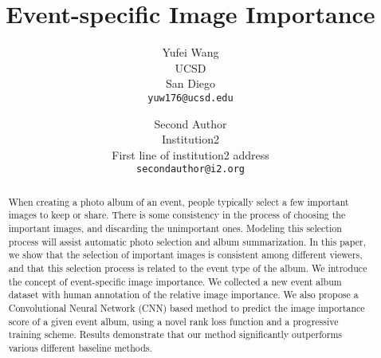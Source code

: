 \documentclass[10pt,twocolumn,letterpaper]{article}
\begin{document}
\title{Event-specific Image Importance}



\author{Yufei Wang\\
UCSD\\
San Diego\\
{\tt\small yuw176@ucsd.edu}
\and
Second Author\\
Institution2\\
First line of institution2 address\\
{\tt\small secondauthor@i2.org}
}

\maketitle

\begin{abstract}
When creating a photo album of an event, people typically select a few important images to keep or share. There is some consistency in the process of choosing the important images, and discarding the unimportant ones. Modeling this selection process will assist automatic photo selection and album summarization.
In this paper, we show that the selection of important images is consistent among different viewers, and that this selection process is related to the event type of the album. We introduce the concept of event-specific image importance. We collected a new event album dataset with human annotation of the relative image importance. We also propose a Convolutional Neural Network (CNN) based method to predict the image importance score of a given event album, using a novel rank loss function and a progressive training scheme. Results demonstrate that our method significantly outperforms various different baseline methods.

 
\end{abstract}
\end{document}
